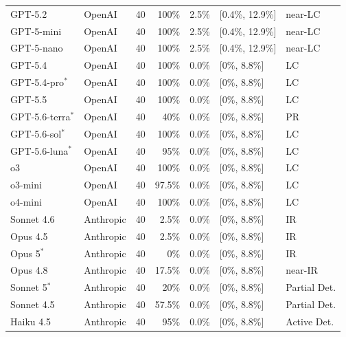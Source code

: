 \documentclass{article}
\begin{document}
\begin{table}[h]
\begin{tabular}{llrrrll}
GPT-5.2 & OpenAI & 40 & 100\% & 2.5\% & [0.4\%, 12.9\%] & near-LC \\
GPT-5-mini & OpenAI & 40 & 100\% & 2.5\% & [0.4\%, 12.9\%] & near-LC \\
GPT-5-nano & OpenAI & 40 & 100\% & 2.5\% & [0.4\%, 12.9\%] & near-LC \\
GPT-5.4 & OpenAI & 40 & 100\% & 0.0\% & [0\%, 8.8\%] & LC \\
GPT-5.4-pro$^\ast$ & OpenAI & 40 & 100\% & 0.0\% & [0\%, 8.8\%] & LC \\
GPT-5.5 & OpenAI & 40 & 100\% & 0.0\% & [0\%, 8.8\%] & LC \\
GPT-5.6-terra$^\ast$ & OpenAI & 40 & 40\% & 0.0\% & [0\%, 8.8\%] & PR \\
GPT-5.6-sol$^\ast$ & OpenAI & 40 & 100\% & 0.0\% & [0\%, 8.8\%] & LC \\
GPT-5.6-luna$^\ast$ & OpenAI & 40 & 95\% & 0.0\% & [0\%, 8.8\%] & LC \\
o3 & OpenAI & 40 & 100\% & 0.0\% & [0\%, 8.8\%] & LC \\
o3-mini & OpenAI & 40 & 97.5\% & 0.0\% & [0\%, 8.8\%] & LC \\
o4-mini & OpenAI & 40 & 100\% & 0.0\% & [0\%, 8.8\%] & LC \\
\midrule
Sonnet 4.6 & Anthropic & 40 & 2.5\% & 0.0\% & [0\%, 8.8\%] & IR \\
Opus 4.5 & Anthropic & 40 & 2.5\% & 0.0\% & [0\%, 8.8\%] & IR \\
Opus 5$^\ast$ & Anthropic & 40 & 0\% & 0.0\% & [0\%, 8.8\%] & IR \\
Opus 4.8 & Anthropic & 40 & 17.5\% & 0.0\% & [0\%, 8.8\%] & near-IR \\
Sonnet 5$^\ast$ & Anthropic & 40 & 20\% & 0.0\% & [0\%, 8.8\%] & Partial Det. \\
Sonnet 4.5 & Anthropic & 40 & 57.5\% & 0.0\% & [0\%, 8.8\%] & Partial Det. \\
Haiku 4.5 & Anthropic & 40 & 95\% & 0.0\% & [0\%, 8.8\%] & Active Det. \\
\bottomrule
\end{tabular}
\par\vspace{2pt}\footnotesize\raggedright

\end{table}
\end{document}
